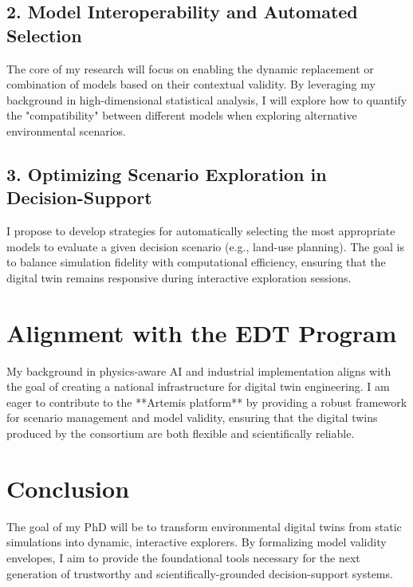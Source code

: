\documentclass[a4paper,11pt]{article}
\begin{document}
\subsection{2. Model Interoperability and Automated Selection}
The core of my research will focus on enabling the dynamic replacement or combination of models based on their contextual validity. By leveraging my background in high-dimensional statistical analysis, I will explore how to quantify the "compatibility" between different models when exploring alternative environmental scenarios.

\subsection{3. Optimizing Scenario Exploration in Decision-Support}
I propose to develop strategies for automatically selecting the most appropriate models to evaluate a given decision scenario (e.g., land-use planning). The goal is to balance simulation fidelity with computational efficiency, ensuring that the digital twin remains responsive during interactive exploration sessions.

\section{Alignment with the EDT Program}
My background in physics-aware AI and industrial implementation aligns with the goal of creating a national infrastructure for digital twin engineering. I am eager to contribute to the **Artemis platform** by providing a robust framework for scenario management and model validity, ensuring that the digital twins produced by the consortium are both flexible and scientifically reliable.

\section{Conclusion}
The goal of my PhD will be to transform environmental digital twins from static simulations into dynamic, interactive explorers. By formalizing model validity envelopes, I aim to provide the foundational tools necessary for the next generation of trustworthy and scientifically-grounded decision-support systems.
\end{document}
